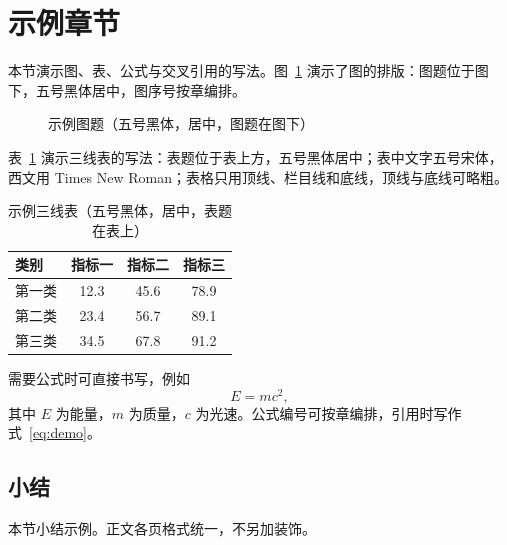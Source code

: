 \documentclass[
  zihao     = -4,          %
  linespread = 1.625,      %
  twoside,                 %
  fontset   = mac          %
]{ctexart}
\begin{document}
\section{示例章节}

本节演示图、表、公式与交叉引用的写法。图~\ref{fig:demo} 演示了图的排版：图题位于图下，五号黑体居中，图序号按章编排。

\begin{figure}[H]
  \centering
  \caption{示例图题（五号黑体，居中，图题在图下）}
  \label{fig:demo}
\end{figure}

表~\ref{tab:demo} 演示三线表的写法：表题位于表上方，五号黑体居中；表中文字五号宋体，西文用 Times New Roman；表格只用顶线、栏目线和底线，顶线与底线可略粗。

\begin{table}[H]
  \centering
  \caption{示例三线表（五号黑体，居中，表题在表上）}
  \label{tab:demo}
  \begin{tabular}{lccc}
    \toprule[1.5pt]
    类别 & 指标一 & 指标二 & 指标三 \\
    \midrule[0.75pt]
    第一类 & 12.3 & 45.6 & 78.9 \\
    第二类 & 23.4 & 56.7 & 89.1 \\
    第三类 & 34.5 & 67.8 & 91.2 \\
    \bottomrule[1.5pt]
  \end{tabular}
\end{table}

需要公式时可直接书写，例如
\begin{equation}
  E = mc^{2},
  \label{eq:demo}
\end{equation}
其中 $E$ 为能量，$m$ 为质量，$c$ 为光速。公式编号可按章编排，引用时写作式~\eqref{eq:demo}。

\subsection{小结}

本节小结示例。正文各页格式统一，不另加装饰。
\end{document}
